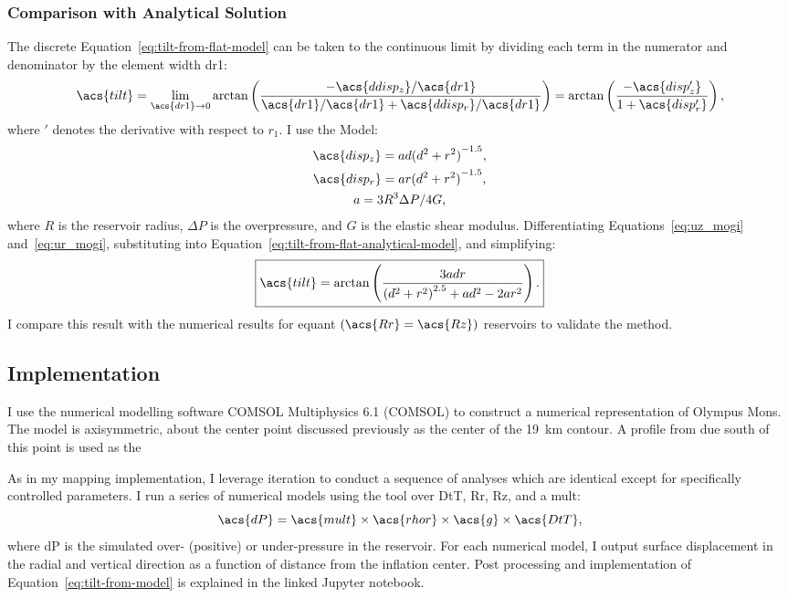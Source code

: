 \subsubsection{Comparison with Analytical Solution}
The discrete Equation~\eqref{eq:tilt-from-flat-model} can be taken to the continuous limit by dividing each term in the numerator and denominator by the element width \acs{dr1}:
\begin{equation}
\acs{tilt}
    = \lim_{\acs{dr1}\to0} 
    \arctan\left(\dfrac{-\acs{ddisp_z}/\acs{dr1}}{\acs{dr1}/\acs{dr1}
    + \acs{ddisp_r}/\acs{dr1}}\right) = 
    \arctan\left(\dfrac{-\acs{disp_z'}}{1+\acs{disp_r'}}\right),\label{eq:tilt-from-flat-analytical-model}
\end{equation}
where $'$ denotes the derivative with respect to $r_1$. I use the \textcite{mogi_relations_1958} Model:
\begin{gather}
    \acs{disp_z} = ad{(d^2+r^2)}^{-1.5},\label{eq:uz_mogi}\\
    \acs{disp_r} = ar{(d^2+r^2)}^{-1.5},\label{eq:ur_mogi}\\
    a = {3R^3\Delta P}/{4G},\nonumber
\end{gather}
where $R$ is the reservoir radius, $\Delta P$ is the overpressure, and $G$ is the elastic shear modulus. Differentiating Equations~\eqref{eq:uz_mogi} and~\eqref{eq:ur_mogi}, substituting into Equation~\eqref{eq:tilt-from-flat-analytical-model}, and simplifying:
\begin{equation}
    \boxed{\acs{tilt} = \arctan\left(\frac{3adr}{{(d^2+r^2)}^{2.5}+ad^2-2ar^2}\right).}\label{eq:tilt-from-mogi-model}
\end{equation}
I compare this result with the numerical results for equant $(\acs{Rr}=\acs{Rz})$ reservoirs to validate the method.

\subsection{Implementation}

I use the numerical modelling software COMSOL Multiphysics 6.1 (COMSOL) to construct a numerical representation of Olympus Mons. The model is axisymmetric, about the center point discussed previously as the center of the \qty{19}{\km} contour. A profile from due south of this point is used as the 

As in my mapping implementation, I leverage iteration to conduct a sequence of analyses which are identical except for specifically controlled parameters. I run a series of numerical models using the  tool over \ac{DtT}, \ac{Rr}, \ac{Rz}, and a \ac{mult}:
\begin{equation}
    \acs{dP}=\acs{mult}\times\acs{rhor}\times\acs{g}\times\acs{DtT},
\end{equation}
where \acs{dP} is the simulated over- (positive) or under-pressure in the reservoir. For each numerical model, I output surface displacement in the radial and vertical direction as a function of distance from the inflation center. Post processing and implementation of Equation~\eqref{eq:tilt-from-model} is explained in the linked Jupyter notebook.
